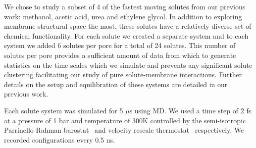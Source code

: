 \documentclass[journal=jpcbfk,manuscript=article]{achemso}
\begin{document}
  We chose to study a subset of 4 of the fastest moving solutes from our previous
  work: methanol, acetic acid, urea and ethylene glycol. In addition to exploring 
  membrane structural space the most, these solutes have a relatively diverse set
  of chemical functionality. For each solute we created a separate system and to 
  each system we added 6 solutes per pore for a total of 24 solutes. This number 
  of solutes per pore provides a sufficient amount of data from which to generate 
  statistics on the time scales which we simulate and prevents any significant
  solute clustering facilitating our study of pure solute-membrane interactions. 
  Further details on the setup and equilibration of these systems are detailed 
  in our previous work.~\cite{coscia_chemically_2019}
  
  Each solute system was simulated for 5 $\mu$s using MD. We used a time step of 2 
  fs at a pressure of 1 bar and temperature of 300K controlled by the semi-isotropic 
  Parrinello-Rahman barostat~\cite{parrinello_polymorphic_1981} and velocity rescale 
  thermostat~\cite{bussi_canonical_2007} respectively. We recorded configurations every 0.5 ns.
  
\end{document}
